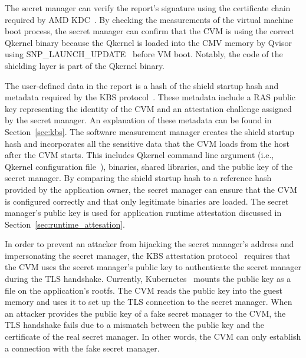 The secret manager can verify the report's signature using the certificate chain required by AMD KDC~\cite*{snp_kdc}. By checking the measurements of the virtual machine boot process, the secret manager can confirm that the CVM is using the correct Qkernel binary because the Qkernel is loaded into the CMV memory by Qvisor using 
 SNP\_LAUNCH\_UPDATE~\cite*{snp_firmware} before VM boot. Notably, the code of the shielding layer is part of the Qkernel binary.

The user-defined data in the report is a hash of the shield startup hash and metadata required by the KBS protocol~\cite*{kbs_Attestation_protocol}. These metadata include a RAS public key representing the identity of the \acrshort{CVM} and an attestation challenge assigned by the secret manager. An explanation of these metadata can be found in Section~\ref{sec:kbs}. The software measurement 
manager creates the shield startup hash and incorporates all the sensitive data that the \acrshort{CVM} loads from the host after the \acrshort{CVM} starts. This includes Qkernel command line argument (i.e., Qkernel configuration file~\cite*{quark_conf_file}), binaries, shared libraries, and the public key of the secret manager. By comparing the shield startup hash
to a reference hash provided by the application owner, the secret manager can ensure that the \acrshort{CVM} is configured correctly and that only legitimate binaries are loaded. The secret manager's public key is used for application runtime attestation discussed in Section~\ref{sec:runtime_attesation}.

In order to prevent an attacker from hijacking the secret manager's address and impersonating the secret manager, the KBS attestation protocol~\cite*{kbs_Attestation_protocol} requires that the CVM uses the secret manager's public key to authenticate the secret manager during the TLS handshake. Currently, Kubernetes~\cite*{k8s} mounts the public key as a file on 
the application's rootfs. The \acrshort{CVM} reads the public key into the guest memory and uses it to set up the TLS connection to the secret manager. When an attacker provides the public key of a fake secret manager to the \acrshort{CVM}, the TLS handshake fails due to a mismatch between the public key and the certificate of the real secret manager. In other words, the 
\acrshort{CVM} can only establish a connection with the fake secret manager.



